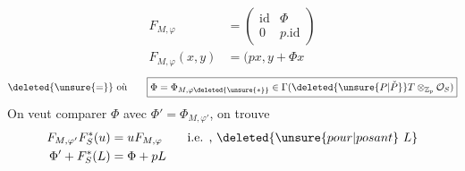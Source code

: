 \[
\begin{aligned}
F_{M,\varphi}&=\begin{pmatrix}\mathrm{id}&\Phi\\0&p.\mathrm{id}\end{pmatrix}\\
F_{M,\varphi}(x,y)&=(px,y+\Phi x
\end{aligned}
\]
\[
\deleted{\unsure{=}}\ \text{où}\qquad \boxed{\Phi=\Phi_{M,\varphi\deleted{\unsure{*}}}\in\Gamma(\deleted{\unsure{P|\check P}}T\otimes_{\mathbb Z_p}\mathcal O_S)}
\]
On veut comparer $\Phi$ avec $\Phi'=\Phi_{M,\varphi'}$, on trouve
\[
\begin{aligned}
F_{M,\varphi'}F_S^*(u)&=uF_{M,\varphi}\qquad\text{i.e. , }\deleted{\unsure{pour|posant}\ L}\\
\Phi'+F_S^*(L)&=\Phi+pL
\end{aligned}
\]
